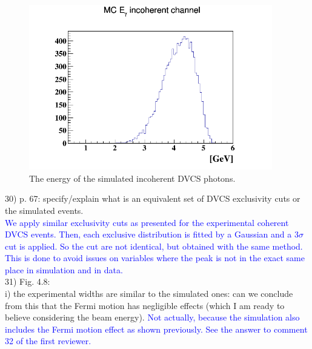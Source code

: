 \begin{figure}[h!]
\centering
\includegraphics[height=7.2cm]{fig/photon_energy_incoh_sim.png}
\caption{The energy of the simulated incoherent DVCS photons.}
\label{fig:sim_incoh}
 \end{figure}

30) p. 67: specify/explain what is an equivalent set of DVCS exclusivity cuts 
or the simulated events.\\
\textcolor{blue}{ We apply similar exclusivity cuts as presented for the 
experimental coherent DVCS events. Then, each exclusive distribution is fitted 
by a Gaussian and a 3$\sigma$ cut is applied. So the cut are not
identical, but obtained with the same method. This is done to avoid issues on 
variables where the peak is not in the exact same place in simulation and in 
data. }\\

31) Fig. 4.8: \\
i) the experimental widths are similar to the simulated ones: can we conclude 
from this that the Fermi motion has negligible effects (which I am ready to 
believe considering the beam energy). 
 \textcolor{blue}{
   Not actually, because the simulation also includes the Fermi motion effect 
as shown previously. See the answer to comment 32 of the first reviewer.  }\\
  
